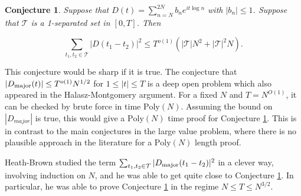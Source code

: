\documentclass{amsart}
\newtheorem{theorem}[prop]{Theorem}
\newtheorem{conj}[prop]{Conjecture}
\newcommand{\Poly}{\textrm{Poly}}
\begin{document}
\begin{conj} \label{conjDirsumdiffset} Suppose that $D(t) = \sum_{n=N}^{2N} b_n e^{i t \log n}$ with $|b_n| \le 1$.   Suppose that $\mathcal{T}$ is a 1-separated set in $[0,T]$.  Then

$$ \sum_{t_1, t_2 \in \mathcal{T}} |D(t_1 - t_2)|^{2} \le T^{o(1)} \left( |\mathcal{T}| N^2 + | \mathcal{T}|^2 N \right). $$

\end{conj}

\noindent This conjecture would be sharp if it is true.   The conjecture that $|D_{\textrm{major}}(t)| \le T^{o(1)} N^{1/2}$ for $1 \le |t| \le T$ is a deep open problem which also appeared in the Halasz-Montgomery argument.   For a fixed $N$ and $T = N^{O(1)}$,  it can be checked by brute force in time $\Poly(N)$.   Assuming the bound on $|D_{major}|$  is true,  this would give a $\Poly(N)$ time proof for Conjecture \ref{conjDirsumdiffset}.   This is in contrast to the main conjectures in the large value problem,  where there is no plausible approach in the literature for a $\Poly(N)$ length proof.

Heath-Brown studied the term $ \sum_{t_1, t_2 \in \mathcal{T}} |D_{\textrm{major}}(t_1 - t_2)|^{2}$ in a clever way,  involving induction on $N$, and he was able to get quite close to Conjecture \ref{conjDirsumdiffset}.   In particular, he was able to prove Conjecture \ref{conjDirsumdiffset} in the regime $N \le T \le N^{3/2}$.   





\end{document}
